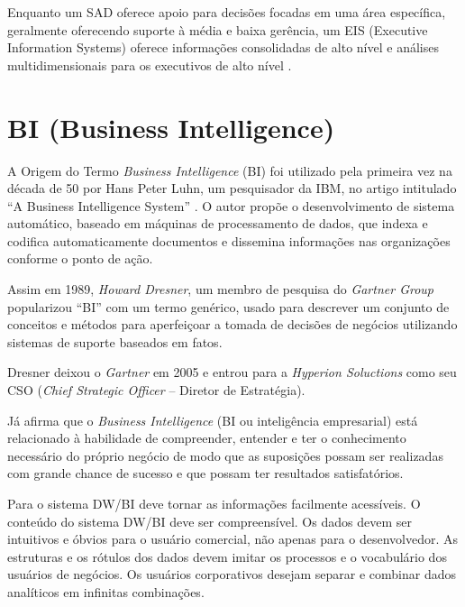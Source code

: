 Enquanto um SAD oferece apoio para decis\~{o}es focadas em uma \'{a}rea espec\'{i}fica, geralmente oferecendo suporte \`{a} m\'{e}dia e baixa gerência, um EIS (Executive Information Systems) oferece informa\c{c}\~{o}es consolidadas de alto n\'{i}vel e an\'{a}lises multidimensionais para os executivos de alto n\'{i}vel \cite{si-gupta-2001}.

\section{BI (Business Intelligence)}

A Origem do Termo \textit{Business Intelligence} (BI) foi utilizado pela primeira vez na d\'{e}cada de 50 por Hans Peter Luhn, um pesquisador da IBM, no artigo intitulado “A Business Intelligence System” \cite{bi-elena-2011}. O autor prop\~{o}e o desenvolvimento de sistema autom\'{a}tico, baseado em m\'{a}quinas de processamento de dados, que indexa e codifica automaticamente documentos e dissemina informa\c{c}\~{o}es nas organiza\c{c}\~{o}es conforme o ponto de a\c{c}\~{a}o.

Assim em 1989, \textit{Howard Dresner}, um membro de pesquisa do \textit{Gartner Group} popularizou “BI” com um termo gen\'{e}rico, usado para descrever um conjunto de conceitos e m\'{e}todos para aperfei\c{c}oar a tomada de decis\~{o}es de neg\'{o}cios utilizando sistemas de suporte baseados em fatos.

Dresner deixou o \textit{Gartner} em 2005 e entrou para a \textit{Hyperion Soluctions} como seu CSO (\textit{Chief Strategic Officer} – Diretor de Estrat\'{e}gia).

J\'{a} \cite{bi-cortes-2008} afirma que o \textit{Business Intelligence} (BI ou intelig\^{e}ncia empresarial) est\'{a} relacionado \`{a} habilidade de compreender, entender e ter o conhecimento necess\'{a}rio do pr\'{o}prio neg\'{o}cio de modo que as suposi\c{c}\~{o}es possam ser realizadas com grande chance de sucesso e que possam ter resultados satisfat\'{o}rios.

Para \cite{dw-kimball-2013} o sistema DW/BI deve tornar as informa\c{c}\~{o}es facilmente acess\'{i}veis. O conteúdo do sistema DW/BI deve ser compreens\'{i}vel. Os dados devem ser intuitivos e \'{o}bvios para o usu\'{a}rio comercial, n\~{a}o apenas para o desenvolvedor. As estruturas e os r\'{o}tulos dos dados devem imitar os processos e o vocabul\'{a}rio dos usu\'{a}rios de neg\'{o}cios. Os usu\'{a}rios corporativos desejam separar e combinar dados anal\'{i}ticos em infinitas combina\c{c}\~{o}es.

